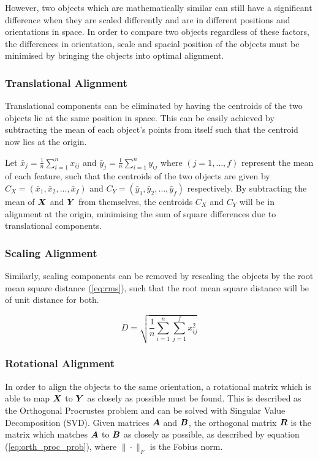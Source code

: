 However, two objects which are mathematically similar can still have a significant difference when they are scaled differently and are in different positions and orientations in space.
In order to compare two objects regardless of these factors, the differences in orientation, scale and spacial position of the objects must be minimised by bringing the objects into optimal alignment.

\subsubsection{Translational Alignment} \label{sec:trans_align}
Translational components can be eliminated by having the centroids of the two objects lie at the same position in space.
This can be easily achieved by subtracting the mean of each object's points from itself such that the centroid now lies at the origin.

Let $\bar{x}_j = \frac{1}{n} \sum_{i=1}^{n} x_{ij}$ and $\bar{y}_j = \frac{1}{n} \sum_{i=1}^{n} y_{ij}$ where $(j = 1, \dots, f)$ represent the mean of each feature, such that the centroids of the two objects are given by $C_X = (\bar{x}_1, \bar{x}_2, \dots, \bar{x}_f)$ and $C_Y = (\bar{y}_1, \bar{y}_2, \dots, \bar{y}_f)$ respectively.
By subtracting the mean of ${\boldsymbol{{X}}}$ and ${\boldsymbol{{Y}}}$ from themselves, the centroids $C_X$ and $C_Y$ will be in alignment at the origin, minimising the sum of square differences due to translational components.

\subsubsection{Scaling Alignment} \label{sec:scale_align}
Similarly, scaling components can be removed by rescaling the objects by the root mean square distance (\ref{eq:rms}), such that the root mean square distance will be of unit distance for both.

\begin{equation}
    \label{eq:rms}
    D = \sqrt{\frac{1}{n} \sum_{i=1}^{n} \sum_{j=1}^{f} x_{ij}^2}
\end{equation}

\subsubsection{Rotational Alignment} \label{sec:rot_align}
In order to align the objects to the same orientation, a rotational matrix which is able to map ${\boldsymbol{{X}}}$ to ${\boldsymbol{{Y}}}$ as closely as possible must be found.
This is described as the Orthogonal Procrustes problem and can be solved with Singular Value Decomposition (SVD).
Given matrices ${\boldsymbol{{A}}}$ and ${\boldsymbol{{B}}}$, the orthogonal matrix ${\boldsymbol{{R}}}$ is the matrix which matches ${\boldsymbol{{A}}}$ to ${\boldsymbol{{B}}}$ as closely as possible, as described by equation (\ref{eq:orth_proc_prob}), where $\| \cdot \|_F$ is the Fobius norm.

